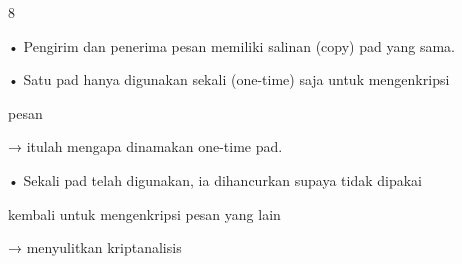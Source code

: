 \documentclass{article}
\begin{document}

8

• Pengirim dan penerima pesan memiliki salinan (copy) pad yang sama.

• Satu pad hanya digunakan sekali (one-time) saja untuk mengenkripsi 

pesan 

  → itulah mengapa dinamakan one-time pad.

• Sekali pad telah digunakan, ia dihancurkan supaya tidak dipakai 

kembali untuk mengenkripsi pesan yang lain 

   → menyulitkan kriptanalisis
\end{document}
